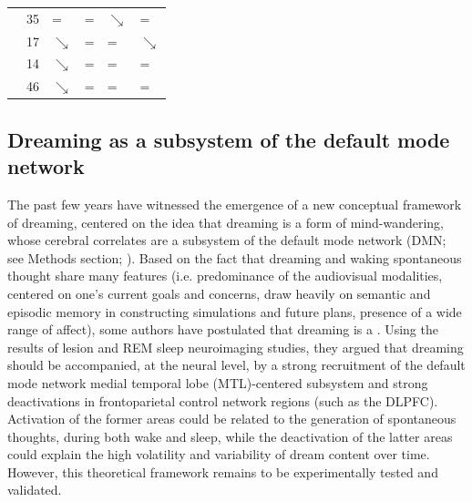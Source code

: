 \begin{table}[!htb]
{\begin{tabularx}{\textwidth}{Xlllll}
	\citealp{marzano_recalling_2011}    & 35         	& =                        			& =                        			& {\color[HTML]{3166FF} $\searrow$}   									& =                               		\\
	\citealp{chellappa_cortical_2011}   & 17         	& {\color[HTML]{3166FF} $\searrow$} & =                        			& =                         											& {\color[HTML]{3166FF} $\searrow$}     \\
	\citealp{scarpelli_predicting_2017} & 14         	& {\color[HTML]{3166FF} $\searrow$} & =                        			& =                          											& =                               		\\
	\citealp{siclari_neural_2017}       & 46         	& {\color[HTML]{3166FF} $\searrow$} & =                        			& =                          											& = 									\\
	\bottomrule
    \end{tabularx}%
    }
\end{table}

\subsection{Dreaming as a subsystem of the default mode network}
\label{sec:dream-research:attempts:dmn}

The past few years have witnessed the emergence of a new conceptual framework of dreaming, centered on the idea that dreaming is a form of mind-wandering, whose cerebral correlates are a subsystem of the default mode network (DMN; see Methods section; \citealp{maquet_human_2005, domhoff_neural_2011, domhoff_dreaming_2015, christoff_mind-wandering_2016}). Based on the fact that dreaming and waking spontaneous thought share many features (i.e. predominance of the audiovisual modalities, centered on one’s current goals and concerns, draw heavily on semantic and episodic memory in constructing simulations and future plans, presence of a wide range of affect), some authors have postulated that dreaming is a  \citep{christoff_mind-wandering_2016}. Using the results of lesion and REM sleep neuroimaging studies, they argued that dreaming should be accompanied, at the neural level, by a strong recruitment of the default mode network medial temporal lobe (MTL)-centered subsystem and strong deactivations in frontoparietal control network regions (such as the DLPFC). Activation of the former areas could be related to the generation of spontaneous thoughts, during both wake and sleep, while the deactivation of the latter areas could explain the high volatility and variability of dream content over time. However, this theoretical framework remains to be experimentally tested and validated.

